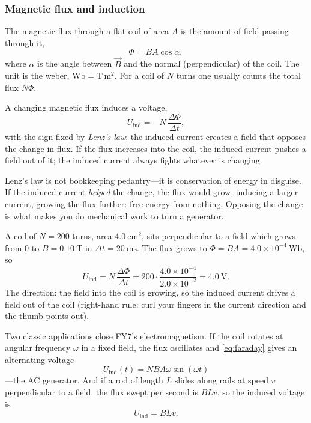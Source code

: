 \subsubsection{Magnetic flux and induction}

\begin{definition}\label{def:flux}
The magnetic flux through a flat coil of area $A$ is the amount of field passing through it,
\[
  \Phi = BA\cos\alpha,
\]
where $\alpha$ is the angle between $\vec{B}$ and the normal (perpendicular) of the coil. The unit is the weber, $\mathrm{Wb} = \mathrm{T\,m^2}$. For a coil of $N$ turns one usually counts the total flux $N\Phi$.
\end{definition}

\begin{definition}\label{def:faraday}
A changing magnetic flux induces a voltage,
\begin{equation}\label{eq:faraday}
  U_\text{ind} = -N\,\frac{\Delta \Phi}{\Delta t},
\end{equation}
with the sign fixed by \emph{Lenz's law}: the induced current creates a field that opposes the change in flux. If the flux increases into the coil, the induced current pushes a field out of it; the induced current always fights whatever is changing.
\end{definition}

Lenz's law is not bookkeeping pedantry---it is conservation of energy in disguise. If the induced current \emph{helped} the change, the flux would grow, inducing a larger current, growing the flux further: free energy from nothing. Opposing the change is what makes you do mechanical work to turn a generator.

\begin{example}\label{exm:coil}
A coil of $N = 200$ turns, area $4.0\ \mathrm{cm^2}$, sits perpendicular to a field which grows from $0$ to $B = 0.10\ \mathrm{T}$ in $\Delta t = 20\ \mathrm{ms}$. The flux grows to $\Phi = BA = 4.0\times 10^{-4}\ \mathrm{Wb}$, so
\[
  U_\text{ind} = N\,\frac{\Delta\Phi}{\Delta t} = 200\cdot\frac{4.0\times 10^{-4}}{2.0\times 10^{-2}} = 4.0\ \mathrm{V}.
\]
The direction: the field into the coil is growing, so the induced current drives a field out of the coil (right-hand rule: curl your fingers in the current direction and the thumb points out).
\end{example}

Two classic applications close FY7's electromagnetism. If the coil rotates at angular frequency $\omega$ in a fixed field, the flux oscillates and \cref{eq:faraday} gives an alternating voltage
\[
  U_\text{ind}(t) = NBA\omega\sin(\omega t)
\]
---the AC generator. And if a rod of length $L$ slides along rails at speed $v$ perpendicular to a field, the flux swept per second is $BLv$, so the induced voltage is
\[
  U_\text{ind} = BLv.
\]

